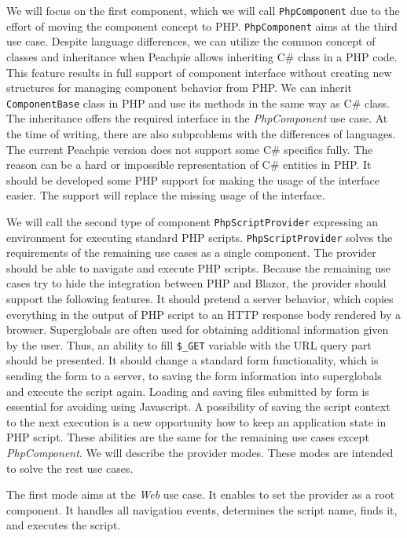 \par
We will focus on the first component, which we will call \texttt{PhpComponent} due to the effort of moving the component concept to PHP.
\texttt{PhpComponent} aims at the third use case.
Despite language differences, we can utilize the common concept of classes and inheritance when Peachpie allows inheriting C\# class in a PHP code.
This feature results in full support of component interface without creating new structures for managing component behavior from PHP.
We can inherit \texttt{ComponentBase} class in PHP and use its methods in the same way as C\# class.
The inheritance offers the required interface in the \textit{PhpComponent} use case.
At the time of writing, there are also subproblems with the differences of languages.
The current Peachpie version does not support some C\# specifics fully.
The reason can be a hard or impossible representation of C\# entities in PHP.
It should be developed some PHP support for making the usage of the interface easier.
The support will replace the missing usage of the interface.
\par
We will call the second type of component \texttt{PhpScriptProvider} expressing an environment for executing standard PHP scripts.
\texttt{PhpScriptProvider} solves the requirements of the remaining use cases as a single component.
The provider should be able to navigate and execute PHP scripts.
Because the remaining use cases try to hide the integration between PHP and Blazor, the provider should support the following features.
It should pretend a server behavior, which copies everything in the output of PHP script to an HTTP response body rendered by a browser.
Superglobals are often used for obtaining additional information given by the user.
Thus, an ability to fill \texttt{\$\_GET} variable with the URL query part should be presented.
It should change a standard form functionality, which is sending the form to a server, to saving the form information into superglobals and execute the script again.
Loading and saving files submitted by form is essential for avoiding using Javascript.
A possibility of saving the script context to the next execution is a new opportunity how to keep an application state in PHP script.
These abilities are the same for the remaining use cases except \textit{PhpComponent}.
We will describe the provider modes.
These modes are intended to solve the rest use cases. 
\par
The first mode aims at the \textit{Web} use case.
It enables to set the provider as a root component.
It handles all navigation events, determines the script name, finds it, and executes the script.
